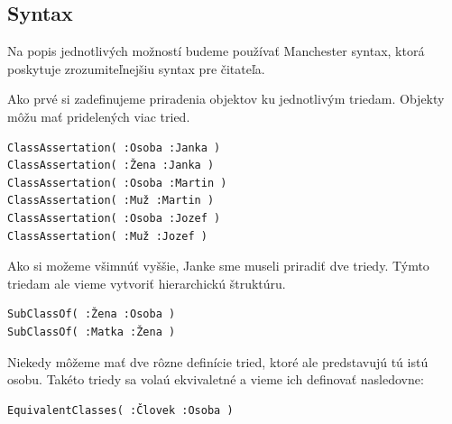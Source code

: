 \documentclass[12pt, a4paper, oneside]{book}
\begin{document}












\subsection{Syntax}
Na popis jednotlivých možností budeme používať Manchester syntax, ktorá poskytuje zrozumiteľnejšiu syntax pre čitateľa.


Ako prvé si zadefinujeme priradenia objektov ku jednotlivým triedam. Objekty môžu mať pridelených viac tried.
\begin{verbatim}
ClassAssertation( :Osoba :Janka )
ClassAssertation( :Žena :Janka )
ClassAssertation( :Osoba :Martin )
ClassAssertation( :Muž :Martin )
ClassAssertation( :Osoba :Jozef )
ClassAssertation( :Muž :Jozef )
\end{verbatim}


Ako si možeme všimnúť vyššie, Janke sme museli priradiť dve triedy. Týmto triedam ale vieme vytvoriť hierarchickú štruktúru.
\begin{verbatim}
SubClassOf( :Žena :Osoba )
SubClassOf( :Matka :Žena )
\end{verbatim}


Niekedy môžeme mať dve rôzne definície tried, ktoré ale predstavujú tú istú osobu. Takéto triedy sa volaú ekvivaletné a vieme ich definovať nasledovne:
\begin{verbatim}
EquivalentClasses( :Človek :Osoba )
\end{verbatim}
\end{document}
